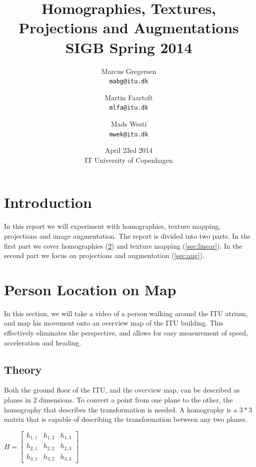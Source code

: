 \documentclass[a4paper,11pt]{article}
\begin{document}
\date{April 23rd 2014\\ IT University of Copenhagen}
\title{Homographies, Textures, Projections and Augmentations\\SIGB Spring 2014}

\author{Marcus Gregersen\\
\texttt{mabg@itu.dk}
\and Martin Faartoft\\
\texttt{mlfa@itu.dk}
\and Mads Westi\\
\texttt{mwek@itu.dk}}
\clearpage\maketitle
\thispagestyle{empty}
\setcounter{page}{1}
\newpage

\section{Introduction}
In this report we will experiment with homographies, texture mapping, projections and image augmentation. The report is divided into two parts. In the first part we cover homographies (\ref{sec:person}) and texture mapping (\ref{sec:linear}). In the second part we focus on projections and augmentation (\ref{sec:aug}).

\section{Person Location on Map}
\label{sec:person}
In this section, we will take a video of a person walking around the ITU atrium, and map his movement onto an overview map of the ITU building. This effectively eliminates the perspective, and allows for easy measurement of speed, acceleration and heading.

\subsection{Theory}
Both the ground floor of the ITU, and the overview map, can be described as planes in 2 dimensions. To convert a point from one plane to the other, the homography that describes the transformation is needed. A homography is a $3*3$ matrix that is capable of describing the transformation between any two planes.
\begin{center}
$H =
\begin{bmatrix}
 h_{1,1} & h_{1,2} & h_{1,3} \\
 h_{2,1} & h_{2,2} & h_{2,3} \\
 h_{3,1} & h_{3,2} & h_{3,3}
\end{bmatrix}
$
\end{center}
\end{document}
